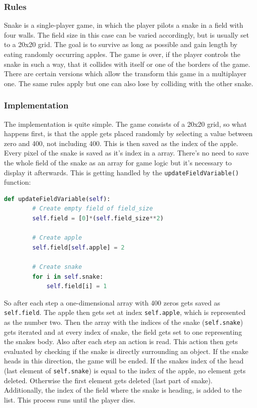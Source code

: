 \documentclass[12pt]{article}
\begin{document}
\subsubsection{Rules}
Snake is a single-player game, in which the player pilots a snake in a field with four walls. The field size in this case can be varied accordingly, but is usually set to a 20x20 grid. The goal is to survive as long as possible and gain length by eating randomly occurring apples. The game is over, if the player controls the snake in such a way, that it collides with itself or one of the borders of the game. There are certain versions which allow the transform this game in a multiplayer one. The same rules apply but one can also lose by colliding with the other snake.
\subsubsection{Implementation}
The implementation is quite simple. The game consists of a 20x20 grid, so what happens first, is that the apple gets placed randomly by selecting a value between zero and 400, not including 400. This is then saved as the index of the apple. Every pixel of the snake is saved as it's index in a array. There's no need to save the whole field of the snake as an array for game logic but it's necessary to display it afterwards. This is getting handled by the \lstinline{updateFieldVariable()} function:
\begin{lstlisting}[language=Python, caption=Example - Create a snake field every second of size \lstinline{self.field_size}]
    def updateFieldVariable(self):
        # Create empty field of field_size
        self.field = [0]*(self.field_size**2)

        # Create apple
        self.field[self.apple] = 2
        
        # Create snake
        for i in self.snake:
            self.field[i] = 1
\end{lstlisting}
So after each step a one-dimensional array with 400 zeros gets saved as \lstinline{self.field}. The apple then gets set at index \lstinline{self.apple}, which is represented as the number two. Then the array with the indices of the snake (\lstinline{self.snake}) gets iterated and at every index of snake, the field gets set to one representing the snakes body. Also after each step an action is read. This action then gets evaluated by checking if the snake is directly surrounding an object. If the snake heads in this direction, the game will be ended. If the snakes index of the head (last element of \lstinline{self.snake}) is equal to the index of the apple, no element gets deleted. Otherwise the first element gets deleted (last part of snake). Additionally, the index of the field where the snake is heading, is added to the list. This process runs until the player dies.
\end{document}
